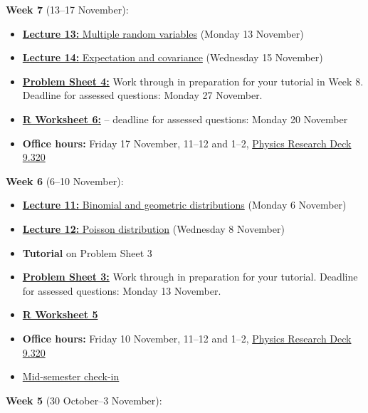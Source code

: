 \documentclass[
  a4paper,
]{book}
\providecommand{\tightlist}{%
  \setlength{\itemsep}{0pt}\setlength{\parskip}{0pt}}
\theoremstyle{definition}
\theoremstyle{definition}
\theoremstyle{definition}
\theoremstyle{definition}
\theoremstyle{remark}
\begin{document}
\textbf{Week 7} (13--17 November):

\begin{itemize}
\tightlist
\item
  \protect\hyperlink{L13-multi-rv}{\textbf{Lecture 13:} Multiple random variables} (Monday 13 November)
\item
  \protect\hyperlink{L14-covariance}{\textbf{Lecture 14:} Expectation and covariance} (Wednesday 15 November)
\item
  \protect\hyperlink{P4}{\textbf{Problem Sheet 4:}} Work through in preparation for your tutorial in Week 8. Deadline for assessed questions: Monday 27 November.
\item
  \protect\hyperlink{R}{\textbf{R Worksheet 6:}} -- deadline for assessed questions: Monday 20 November
\item
  \textbf{Office hours:} Friday 17 November, 11--12 and 1--2, \href{https://mpaldridge.github.io/office.html}{Physics Research Deck 9.320}
\end{itemize}

\textbf{Week 6} (6--10 November):

\begin{itemize}
\tightlist
\item
  \protect\hyperlink{L11-binomial-geometric}{\textbf{Lecture 11:} Binomial and geometric distributions} (Monday 6 November)
\item
  \protect\hyperlink{L12-poisson}{\textbf{Lecture 12:} Poisson distribution} (Wednesday 8 November)
\item
  \textbf{Tutorial} on Problem Sheet 3
\item
  \protect\hyperlink{P3}{\textbf{Problem Sheet 3:}} Work through in preparation for your tutorial. Deadline for assessed questions: Monday 13 November.
\item
  \protect\hyperlink{R}{\textbf{R Worksheet 5}}
\item
  \textbf{Office hours:} Friday 10 November, 11--12 and 1--2, \href{https://mpaldridge.github.io/office.html}{Physics Research Deck 9.320}
\item
  \href{https://forms.office.com/e/8ETiji58Zi}{Mid-semester check-in}
\end{itemize}

\textbf{Week 5} (30 October--3 November):
\end{document}
